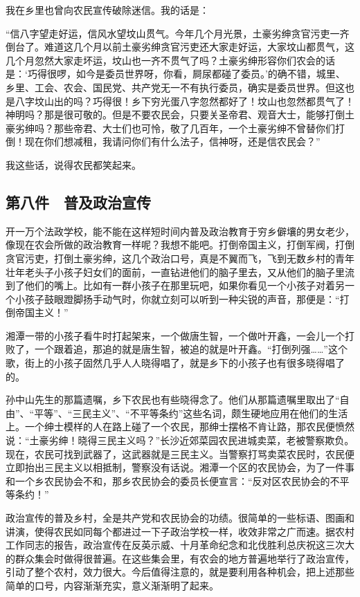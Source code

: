 我在乡里也曾向农民宣传破除迷信。我的话是：

“信八字望走好运，信风水望坟山贯气。今年几个月光景，土豪劣绅贪官污吏一齐倒台了。难道这几个月以前土豪劣绅贪官污吏还大家走好运，大家坟山都贯气，这几个月忽然大家走坏运，坟山也一齐不贯气了吗？土豪劣绅形容你们农会的话是：‘巧得很啰，如今是委员世界呀，你看，屙尿都碰了委员。’的确不错，城里、乡里、工会、农会、国民党、共产党无一不有执行委员，确实是委员世界。但这也是八字坟山出的吗？巧得很！乡下穷光蛋八字忽然都好了！坟山也忽然都贯气了！神明吗？那是很可敬的。但是不要农民会，只要关圣帝君、观音大士，能够打倒土豪劣绅吗？那些帝君、大士们也可怜，敬了几百年，一个土豪劣绅不曾替你们打倒！现在你们想减租，我请问你们有什么法子，信神呀，还是信农民会？”

我这些话，说得农民都笑起来。

\subsection*{第八件　普及政治宣传}

开一万个法政学校，能不能在这样短时间内普及政治教育于穷乡僻壤的男女老少，像现在农会所做的政治教育一样呢？我想不能吧。打倒帝国主义，打倒军阀，打倒贪官污吏，打倒土豪劣绅，这几个政治口号，真是不翼而飞，飞到无数乡村的青年壮年老头子小孩子妇女们的面前，一直钻进他们的脑子里去，又从他们的脑子里流到了他们的嘴上。比如有一群小孩子在那里玩吧，如果你看见一个小孩子对着另一个小孩子鼓眼蹬脚扬手动气时，你就立刻可以听到一种尖锐的声音，那便是：“打倒帝国主义！”

湘潭一带的小孩子看牛时打起架来，一个做唐生智，一个做叶开鑫，一会儿一个打败了，一个跟着追，那追的就是唐生智，被追的就是叶开鑫。“打倒列强……”这个歌，街上的小孩子固然几乎人人晓得唱了，就是乡下的小孩子也有很多晓得唱了的。

孙中山先生的那篇遗嘱，乡下农民也有些晓得念了。他们从那篇遗嘱里取出了“自由”、“平等”、“三民主义”、“不平等条约”这些名词，颇生硬地应用在他们的生活上。一个绅士模样的人在路上碰了一个农民，那绅士摆格不肯让路，那农民便愤然说：“土豪劣绅！晓得三民主义吗？”长沙近郊菜园农民进城卖菜，老被警察欺负。现在，农民可找到武器了，这武器就是三民主义。当警察打骂卖菜农民时，农民便立即抬出三民主义以相抵制，警察没有话说。湘潭一个区的农民协会，为了一件事和一个乡农民协会不和，那乡农民协会的委员长便宣言：“反对区农民协会的不平等条约！”

政治宣传的普及乡村，全是共产党和农民协会的功绩。很简单的一些标语、图画和讲演，使得农民如同每个都进过一下子政治学校一样，收效非常之广而速。据农村工作同志的报告，政治宣传在反英示威、十月革命纪念和北伐胜利总庆祝这三次大的群众集会时做得很普遍。在这些集会里，有农会的地方普遍地举行了政治宣传，引动了整个农村，效力很大。今后值得注意的，就是要利用各种机会，把上述那些简单的口号，内容渐渐充实，意义渐渐明了起来。

